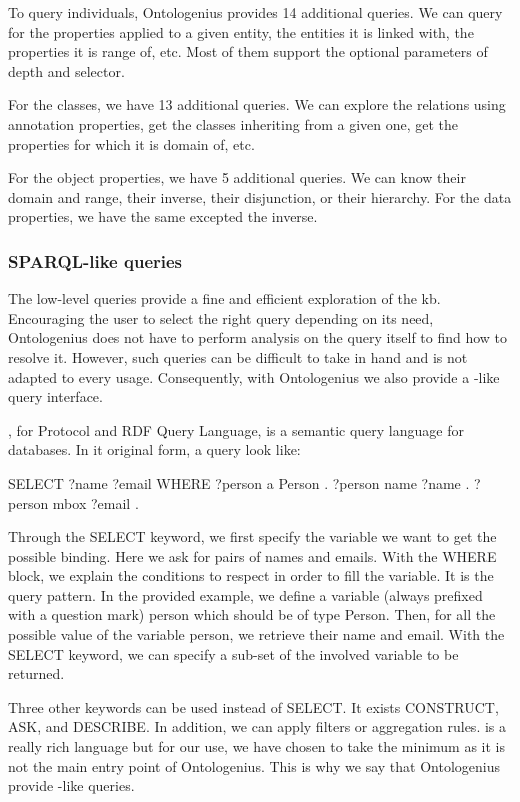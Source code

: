 To query individuals, Ontologenius provides 14 additional queries. We can query for the properties applied to a given entity, the entities it is linked with, the properties it is range of, etc. Most of them support the optional parameters of depth and selector.

For the classes, we have 13 additional queries. We can explore the relations using annotation properties, get the classes inheriting from a given one, get the properties for which it is domain of, etc.

For the object properties, we have 5 additional queries. We can know their domain and range, their inverse, their disjunction, or their hierarchy. For the data properties, we have the same excepted the inverse.

\subsubsection{SPARQL-like queries}

The low-level queries provide a fine and efficient exploration of the \acrshort{kb}. Encouraging the user to select the right query depending on its need, Ontologenius does not have to perform analysis on the query itself to find how to resolve it. However, such queries can be difficult to take in hand and is not adapted to every usage. Consequently, with Ontologenius we also provide a \sparql{}-like query interface.

\sparql{}, for \sparql{} Protocol and RDF Query Language, is a semantic query language for databases. In it original form, a \sparql{} query look like:

\begin{verbatimtab}
SELECT ?name 
       ?email
WHERE
  {
    ?person  a     Person .
    ?person  name  ?name .
    ?person  mbox  ?email .
  }
\end{verbatimtab}

Through the SELECT keyword, we first specify the variable we want to get the possible binding. Here we ask for pairs of names and emails. With the WHERE block, we explain the conditions to respect in order to fill the variable. It is the query pattern. In the provided example, we define a variable (always prefixed with a question mark) person which should be of type Person. Then, for all the possible value of the variable person, we retrieve their name and email. With the SELECT keyword, we can specify a sub-set of the involved variable to be returned.

Three other keywords can be used instead of SELECT. It exists CONSTRUCT, ASK, and DESCRIBE. In addition, we can apply filters or aggregation rules. \sparql{} is a really rich language but for our use, we have chosen to take the minimum as it is not the main entry point of Ontologenius. This is why we say that Ontologenius provide \sparql{}-like queries.

